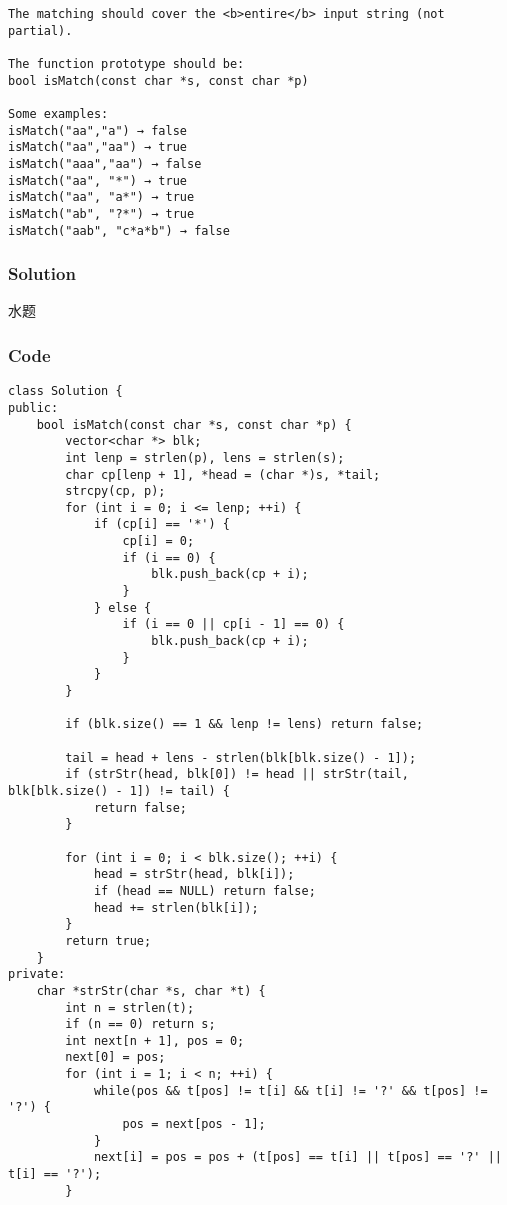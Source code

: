 \documentclass[courier]{article}
\begin{document}
\begin{CJK*}{UTF8}{gkai}
\begin{verbatim}
The matching should cover the <b>entire</b> input string (not partial).

The function prototype should be:
bool isMatch(const char *s, const char *p)

Some examples:
isMatch("aa","a") → false
isMatch("aa","aa") → true
isMatch("aaa","aa") → false
isMatch("aa", "*") → true
isMatch("aa", "a*") → true
isMatch("ab", "?*") → true
isMatch("aab", "c*a*b") → false
\end{verbatim}


\subsubsection*{Solution}
水题

\subsubsection*{Code}
\begin{lstlisting}
class Solution {
public:
    bool isMatch(const char *s, const char *p) {
        vector<char *> blk;
        int lenp = strlen(p), lens = strlen(s);
        char cp[lenp + 1], *head = (char *)s, *tail;
        strcpy(cp, p);
        for (int i = 0; i <= lenp; ++i) {
            if (cp[i] == '*') {
                cp[i] = 0;
                if (i == 0) {
                    blk.push_back(cp + i);
                }
            } else {
                if (i == 0 || cp[i - 1] == 0) {
                    blk.push_back(cp + i);
                }
            }
        }
        
        if (blk.size() == 1 && lenp != lens) return false;
        
        tail = head + lens - strlen(blk[blk.size() - 1]);
        if (strStr(head, blk[0]) != head || strStr(tail, blk[blk.size() - 1]) != tail) {
            return false;
        }
        
        for (int i = 0; i < blk.size(); ++i) {
            head = strStr(head, blk[i]);
            if (head == NULL) return false;
            head += strlen(blk[i]);
        }
        return true;
    }
private:
    char *strStr(char *s, char *t) {
        int n = strlen(t);
        if (n == 0) return s;
        int next[n + 1], pos = 0;
        next[0] = pos;
        for (int i = 1; i < n; ++i) {
            while(pos && t[pos] != t[i] && t[i] != '?' && t[pos] != '?') {
                pos = next[pos - 1];
            }
            next[i] = pos = pos + (t[pos] == t[i] || t[pos] == '?' || t[i] == '?');
        }


\end{lstlisting}
\end{CJK*}
\end{document}
